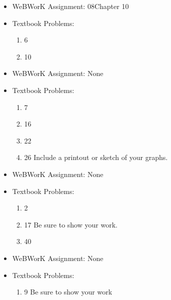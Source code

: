 \documentclass[12pt]{article}
\begin{document}
\newpage
{}  
\begin{itemize}
\setlength{\itemsep}{0mm}
\item WeBWorK Assignment: 08Chapter 10
\item Textbook Problems:
  \begin{enumerate}
  \setlength{\itemsep}{-1mm}
     \item 6
     \item 10
  \end{enumerate}
\end{itemize}

\begin{itemize}
\setlength{\itemsep}{0mm}
\item WeBWorK Assignment: None
\item Textbook Problems:
  \begin{enumerate}
  \setlength{\itemsep}{-1mm}
     \item 7
     \item 16
     \item 22
     \item 26 Include a printout or sketch of your graphs.
  \end{enumerate}
\end{itemize}



\begin{itemize}
\setlength{\itemsep}{0mm}
\item WeBWorK Assignment: None
\item Textbook Problems:
  \begin{enumerate}
  \setlength{\itemsep}{-1mm}
     \item 2
     \item 17 Be sure to show your work.
     \item 40
  \end{enumerate}
\end{itemize}



\begin{itemize}
\setlength{\itemsep}{0mm}
\item WeBWorK Assignment: None
\item Textbook Problems:
  \begin{enumerate}
  \setlength{\itemsep}{-1mm}
     \item 9 Be sure to show your work
  \end{enumerate}
\end{itemize}
\end{document}
